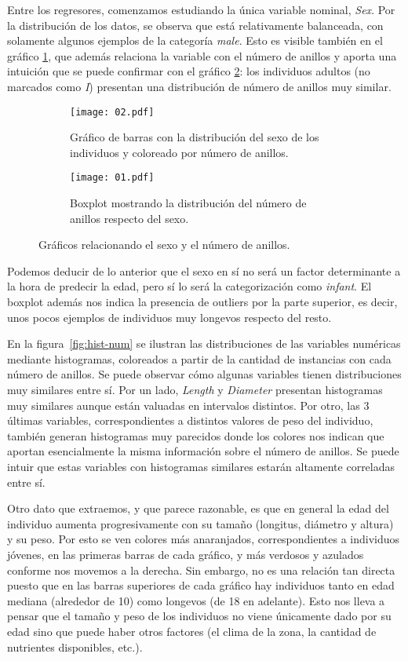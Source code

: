 \documentclass[a4paper, 11pt]{article}
\begin{document}
Entre los regresores, comenzamos estudiando la única variable nominal, \textit{Sex}. Por la distribución de los datos, se observa que está relativamente balanceada, con solamente algunos ejemplos de la categoría \textit{male}. Esto es visible también en el gráfico \ref{fig:bars-sex}, que además relaciona la variable con el número de anillos y aporta una intuición que se puede confirmar con el gráfico \ref{fig:boxplot-sex}: los individuos adultos (no marcados como \textit{I}) presentan una distribución de número de anillos muy similar.
\begin{figure}[ht]
  \begin{subfigure}{0.48\textwidth}
    \centering
    \texttt{[image: 02.pdf]}
    \caption{\label{fig:bars-sex}Gráfico de barras con la distribución del sexo de los individuos y coloreado por número de anillos.}
  \end{subfigure}
  \hfill
  \begin{subfigure}{0.48\textwidth}
    \centering
    \texttt{[image: 01.pdf]}
    \caption{\label{fig:boxplot-sex}Boxplot mostrando la distribución del número de anillos respecto del sexo.}
  \end{subfigure}
  \caption{\label{fig:sex}Gráficos relacionando el sexo y el número de anillos.}
\end{figure}


Podemos deducir de lo anterior que el sexo en sí no será un factor determinante a la hora de predecir la edad, pero sí lo será la categorización como \textit{infant}. El boxplot además nos indica la presencia de outliers por la parte superior, es decir, unos pocos ejemplos de individuos muy longevos respecto del resto.

En la figura~\ref{fig:hist-num} se ilustran las distribuciones de las variables numéricas mediante histogramas, coloreados a partir de la cantidad de instancias con cada número de anillos. Se puede observar cómo algunas variables tienen distribuciones muy similares entre sí. Por un lado, \textit{Length} y \textit{Diameter} presentan histogramas muy similares aunque están valuadas en intervalos distintos. Por otro, las 3 últimas variables, correspondientes a distintos valores de peso del individuo, también generan histogramas muy parecidos donde los colores nos indican que aportan esencialmente la misma información sobre el número de anillos. Se puede intuir que estas variables con histogramas similares estarán altamente correladas entre sí.

Otro dato que extraemos, y que parece razonable, es que en general la edad del individuo aumenta progresivamente con su tamaño (longitus, diámetro y altura) y su peso. Por esto se ven colores más anaranjados, correspondientes a individuos jóvenes, en las primeras barras de cada gráfico, y más verdosos y azulados conforme nos movemos a la derecha. Sin embargo, no es una relación tan directa puesto que en las barras superiores de cada gráfico hay individuos tanto en edad mediana (alrededor de 10) como longevos (de 18 en adelante). Esto nos lleva a pensar que el tamaño y peso de los individuos no viene únicamente dado por su edad sino que puede haber otros factores (el clima de la zona, la cantidad de nutrientes disponibles, etc.).
\end{document}
